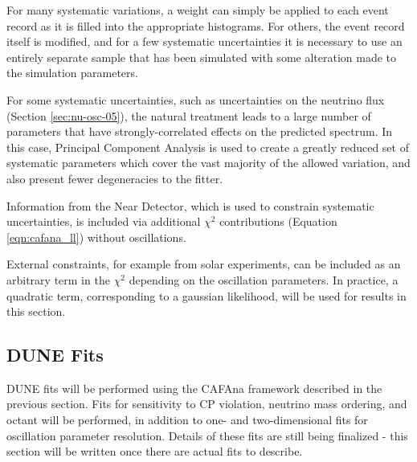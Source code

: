 For many systematic variations, a weight can simply be applied to each event record as it is filled into the appropriate histograms. For others, the event record itself is modified, and for a few systematic uncertainties it is necessary to use an entirely separate sample that has been simulated with some alteration made to the simulation parameters.

For some systematic uncertainties, such as uncertainties on the neutrino flux (Section \ref{sec:nu-osc-05}), the natural treatment leads to a large number of parameters that have strongly-correlated effects on the predicted spectrum. In this case, Principal Component Analysis is used to create a greatly reduced set of systematic parameters which cover the vast majority of the allowed variation, and also present fewer degeneracies to the fitter.

Information from the Near Detector, which is used to constrain systematic uncertainties, is included via additional $\chi^2$ contributions (Equation \ref{eqn:cafana_ll}) without oscillations. 

External constraints, for example from solar experiments, can be included as an arbitrary term in the $\chi^2$ depending on the oscillation parameters. In practice, a quadratic term, corresponding to a gaussian likelihood, will be used for results in this section.

\subsection{DUNE Fits}
\label{sect:methods-dunefits}
DUNE fits will be performed using the CAFAna framework described in the previous section. Fits for sensitivity to CP violation, neutrino mass ordering, and octant will be performed, in addition to one- and two-dimensional fits for oscillation parameter resolution. Details of these fits are still being finalized - this section will be written once there are actual fits to describe.
